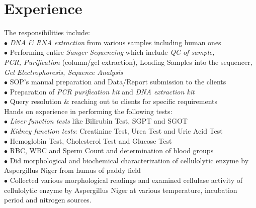 \documentclass[letterpaper]{twentysecondcv} %
\begin{document}

\section{Experience}

\begin{twenty} %
	{The responsibilities include:\\
	$\bullet$ \emph{ DNA \& RNA extraction} from various samples including human ones\\
	$\bullet$ Performing entire \emph{ Sanger Sequencing} which include \emph{QC of sample,\\ \phantom{i}  PCR, Purification} (column/gel extraction), Loading Samples into \phantom{ix}the sequencer,\emph{ Gel Electrophoresis, Sequence Analysis}\\
	$\bullet$ SOP's manual preparation and Data/Report submission to the clients\\
	$\bullet$ Preparation of\emph{ PCR purification kit} and \emph{ DNA extraction kit}\\
	$\bullet$ Query resolution \& reaching out to clients for specific requirements\\
	}
	{Hands on experience in performing the following tests:\\
	$\bullet$ \emph{Liver function tests} like Bilirubin Test, SGPT and SGOT\\
	$\bullet$\emph{ Kidney function tests}: Creatinine Test, Urea Test and Uric Acid Test\\
	$\bullet$ Hemoglobin Test, Cholesterol Test and  Glucose  Test\\
	$\bullet$ RBC, WBC and Sperm Count and determination of blood groups\\
	}
	{$\bullet$ Did morphological and biochemical characterization of cellulolytic \phantom{ix}enzyme by Aspergillus Niger from humus of paddy field\\
	$\bullet$ Collected various morphological readings and examined cellulase  \phantom{ix}activity of cellulolytic enzyme by Aspergillus Niger at various \phantom{ix}temperature, incubation period and nitrogen sources.\\\\
	}

\end{twenty}
\end{document}
